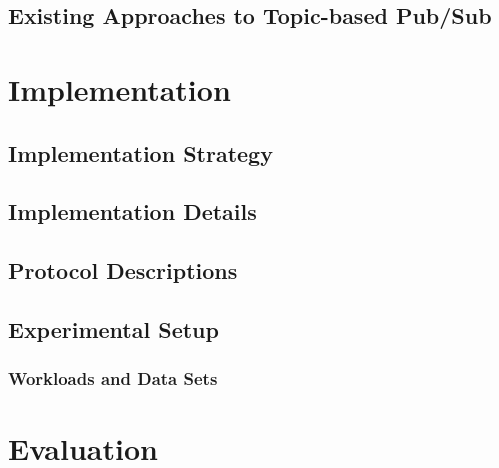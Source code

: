 \documentclass[UKenglish, a4paper]{ifimaster}
\begin{document}
    \chapter{Existing Approaches to Topic-based Pub/Sub}
    


\part{Implementation}
    \chapter{Implementation Strategy}
    \chapter{Implementation Details}
    \chapter{Protocol Descriptions}
    \chapter{Experimental Setup}
        \section{Workloads and Data Sets}


\part{Evaluation}
\end{document}
